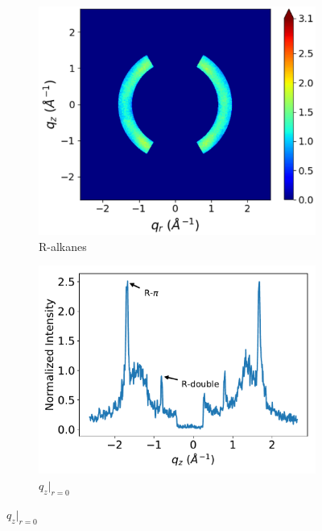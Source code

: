 \documentclass[journal=jpcbfk,manuscript=article]{achemso}
\begin{document}
  \begin{figure}[!htb]
  \centering
  \begin{subfigure}{0.45\linewidth}
  \centering
  \includegraphics[width=\textwidth]{ralkanes.pdf}  %
  \caption{R-alkanes}\label{fig:ralkanes}
  \end{subfigure}
  \begin{subfigure}{0.45\linewidth}
  \centering
  \includegraphics[width=\textwidth]{rpi_rdouble.pdf}  %
  \caption{$q_z|_{r=0}$}\label{fig:rpi_rdouble}
  \end{subfigure}

\end{figure}
\end{document}
